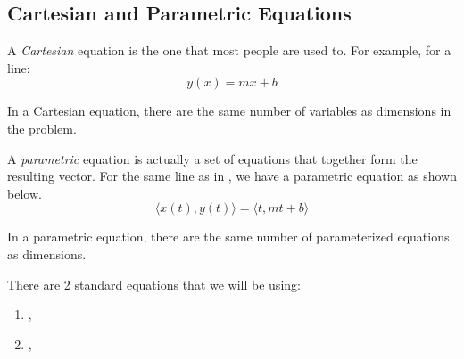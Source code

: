 \subsection{Cartesian and Parametric Equations}\label{subsec:Cartesian_Parametric}
\begin{definition}[Cartesian]\label{def:Cartesian}
  A \emph{Cartesian} equation is the one that most people are used to.
  For example, for a line:
  \begin{equation}\label{eq:Generic_Cartesian_Line}
    y(x) = mx + b
  \end{equation}

  In a Cartesian equation, there are the same number of variables as dimensions in the problem.
\end{definition}

\begin{definition}[Parametric]\label{def:Parametric}
  A \emph{parametric} equation is actually a set of equations that together form the resulting vector.
  For the same line as in , we have a parametric equation as shown below.
  \begin{equation}\label{eq:Generic_Parametric_Line}
    \langle x(t), y(t) \rangle = \langle t, mt + b \rangle
  \end{equation}

  In a parametric equation, there are the same number of parameterized equations as dimensions.
\end{definition}

There are 2 standard  equations that we will be using:
\begin{enumerate}[noitemsep]
\item {}, 
\item {}, 
\end{enumerate}


